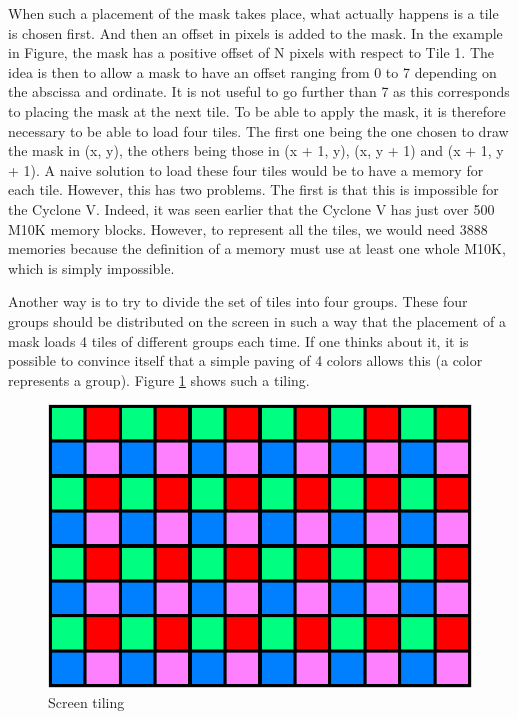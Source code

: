 When such a placement of the mask takes place, what actually happens is a tile is chosen first. And 
then an offset in pixels is added to the mask. In the example in Figure, the mask has a positive 
offset of N pixels with respect to Tile 1. The idea is then to allow a mask to have an offset 
ranging from 0 to 7 depending on the abscissa and ordinate. It is not useful to go further than 7 
as this corresponds to placing the mask at the next tile. To be able to apply the mask, it is 
therefore necessary to be able to load four tiles. The first one being the one chosen to draw the 
mask in (x, y), the others being those in (x + 1, y), (x, y + 1) and (x + 1, y + 1). A naive 
solution to load these four tiles would be to have a memory for each tile. However, this has two 
problems. The first is that this is impossible for the Cyclone V. Indeed, it was seen earlier that 
the Cyclone V has just over 500 M10K memory blocks. However, to represent all the tiles, we would 
need 3888 memories because the definition of a memory must use at least one whole M10K, which is 
simply impossible. 

Another way is to try to divide the set of tiles into four groups. These four groups should be 
distributed on the screen in such a way that the placement of a mask loads 4 tiles of different 
groups each time. If one thinks about it, it is possible to convince itself that a simple paving 
of 4 colors allows this (a color represents a group). Figure \ref{fig:gpu/screen_tiling} shows such 
a tiling. 

\begin{figure}[H]
    \centering
    \includegraphics[scale=1.0]{Chapter4-GPU_CLKU/res/screen_tiling}
    \caption{Screen tiling}
    \label{fig:gpu/screen_tiling}
\end{figure}

